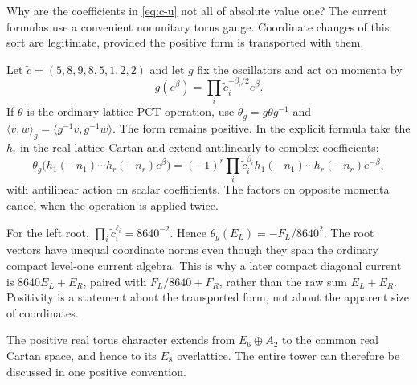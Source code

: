 Why are the coefficients in \eqref{eq:c-u} not all of absolute value
one? The current formulas use a convenient nonunitary torus gauge.
Coordinate changes of this sort are legitimate, provided the positive
form is transported with them.

Let $\widetilde c=(5,8,9,8,5,1,2,2)$ and let $g$ fix the oscillators
and act on momenta by
\[
 g(e^\beta)=\prod_i\widetilde c_i^{-\beta_i/2}e^\beta.
\]
If $\theta$ is the ordinary lattice PCT operation, use
$\theta_g=g\theta g^{-1}$ and
$\langle v,w\rangle_g=\langle g^{-1}v,g^{-1}w\rangle$.
The form remains positive. In the explicit formula take the $h_i$
in the real lattice Cartan and extend antilinearly to complex coefficients:
\begin{equation}\label{eq:c-pct}
 \theta_g\bigl(h_1(-n_1)\cdots h_r(-n_r)e^\beta\bigr)
 =(-1)^r\prod_i\widetilde c_i^{\beta_i}
               h_1(-n_1)\cdots h_r(-n_r)e^{-\beta},
\end{equation}
with antilinear action on scalar coefficients. The factors on opposite
momenta cancel when the operation is applied twice.

\begin{example}
For the left root,
$\prod_i\widetilde c_i^{\ell_i}=8640^{-2}$. Hence
$\theta_g(E_L)=-F_L/8640^2$. The root vectors have unequal coordinate
norms even though they span the ordinary compact level-one current
algebra. This is why a later compact diagonal current is
$8640E_L+E_R$, paired with $F_L/8640+F_R$, rather than the raw sum
$E_L+E_R$. Positivity is a statement about the transported form, not
about the apparent size of coordinates.
\end{example}

The positive real torus character extends from $E_6\oplus A_2$ to
the common real Cartan space, and hence to its $E_8$ overlattice.
The entire tower can therefore be discussed in one positive convention.

